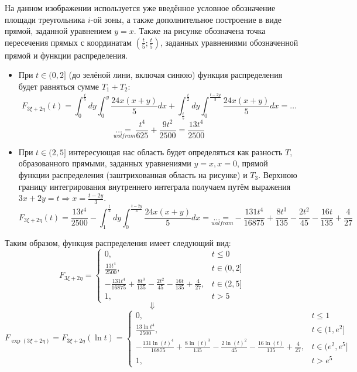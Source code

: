 \begin{itemize}
\begin{figure}[H]
	\end{figure}
	На данном изображении используется уже введённое условное обозначение площади треугольника $i$-ой зоны, а также дополнительное построение в виде прямой, заданной уравнением $y=x$. Также на рисунке обозначена точка пересечения прямых с координатам $\left(\frac{t}{5}; \frac{t}{5}\right)$, заданных уравнениями обозначенной прямой и функции распределения.
	\begin{itemize}
		\item При $t \in (0, 2]$ (до зелёной лини, включая синюю) функция распределения будет равняться сумме $T_1 + T_2:$
		\[ F_{3 \xi + 2 \eta} (t) = \int_{0}^{\frac{t}{5}}dy \int_{0}^{y} \frac{24x(x+y)}{5} dx + \int_{\frac{t}{5}}^{\frac{t}{2}} dy \int_{0}^{\frac{t-2y}{3}} \frac{24x(x+y)}{5} dx = \dots \]
		\[ \underset{wolfram}{\dots =} \frac{t^4}{625} + \frac{9t^2}{2500} = \frac{13t^4}{2500} \]
		\item При $t \in (2, 5]$ интересующая нас область будет определяться как разность $T$, образованного прямыми, заданных уравнениями $y=x, x=0$, прямой функции распределения (заштрихованная область на рисунке) и $T_3$.
		Верхнюю границу интегрирования внутреннего интеграла получаем путём выражения $3x+2y=t \Rightarrow x = \frac{t - 2y}{3}$.
		\[  F_{3 \xi + 2 \eta} (t) = \frac{13t^4}{2500} - \int_{1}^{\frac{t}{2}}dy \int_{0}^{\frac{t-2y}{3}} \frac{24x(x+y)}{5} dx = \underset{wolfram}{\dots = } -\frac{131 t^4}{16875}+\frac{8 t^3}{135}-\frac{2 t^2}{45}-\frac{16 t}{135}+\frac{4}{27} \]
	\end{itemize}
	Таким образом, функция распределения имеет следующий вид:
	\[
	F_{3 \xi + 2 \eta} =
	\begin{cases}
		0, &t \le 0 \\
		\frac{13t^4}{2500}, & t \in (0,2] \\
		-\frac{131 t^4}{16875}+\frac{8 t^3}{135}-\frac{2 t^2}{45}-\frac{16 t}{135}+\frac{4}{27}, &t \in (2, 5] \\
		1, &t > 5
	\end{cases}
	\]
	\[ \Downarrow \]
	\[
	F_{\exp(3 \xi + 2 \eta)} = F_{3\xi+2\eta}(\ln t) =
	\begin{cases}
		0, &t \le 1 \\
		\frac{13 \ln t^4}{2500}, &t \in (1, e^2] \\
		-\frac{131 \ln (t)^4}{16875}+\frac{8 \ln (t)^3}{135}-\frac{2 \ln (t)^2}{45}-\frac{16 \ln (t)}{135}+\frac{4}{27}, &t \in (e^2, e^5] \\
		1, & t > e^5
	\end{cases}
	\]
\end{itemize}

